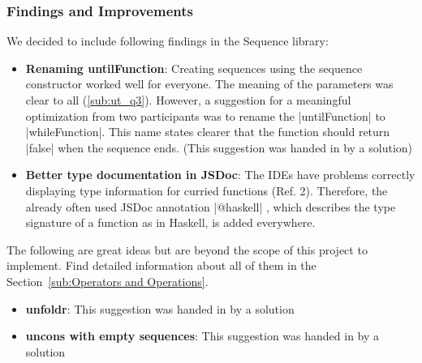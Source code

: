 \subsubsection{Findings and Improvements} %
\label{subsub:seq_findings_and_improvements}
We decided to include following findings in the Sequence library:
\begin{itemize}
  \item \textbf{Renaming untilFunction}: Creating sequences using the sequence
    constructor worked well for everyone. The meaning of the parameters was
    clear to all (\ref{sub:ut_q3}). However, a suggestion for a meaningful
    optimization from two participants was to rename the |untilFunction| to
    |whileFunction|. This name states clearer that the function should return
    |false| when the sequence ends. (This suggestion was handed in by a
    solution)
  \item \textbf{Better type documentation in JSDoc}: The IDEs have problems
    correctly displaying type information for curried functions (Ref. 2).
    Therefore, the already often used JSDoc annotation |@haskell| , which
    describes the type signature of a function as in Haskell, is added
    everywhere.
\end{itemize}
The following are great ideas but are beyond the scope of this project to
implement. Find detailed information about all of them in the
Section~\ref{sub:Operators and Operations}.
\begin{itemize}
  \item \textbf{unfoldr}: This suggestion was handed in by a solution
  \item \textbf{uncons with empty sequences}: This suggestion was handed in by a solution
\end{itemize}

